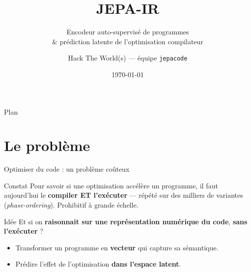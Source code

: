 \documentclass[aspectratio=169,11pt]{beamer}
\title{JEPA-IR}
\subtitle{Encodeur auto-supervisé de programmes \\ \& prédiction latente de l'optimisation compilateur}
\author{Hack The World(s) — équipe \texttt{jepacode}}
\date{\today}
\newcommand{\hl}[1]{\textcolor{jblue}{\textbf{#1}}}
\newcommand{\bad}[1]{\textcolor{jred}{\textbf{#1}}}
\begin{document}
\maketitle

\begin{frame}{Plan}
  \tableofcontents
\end{frame}

\section{Le problème}
\begin{frame}{Optimiser du code : un problème coûteux}
  \begin{block}{Constat}
    Pour savoir si une optimisation accélère un programme, il faut aujourd'hui
    le \bad{compiler ET l'exécuter} — répété sur des milliers de variantes
    (\emph{phase-ordering}). Prohibitif à grande échelle.
  \end{block}
  \pause
  \begin{alertblock}{Idée}
    Et si on \hl{raisonnait sur une représentation numérique du code},
    \hl{sans l'exécuter} ?
  \end{alertblock}
  \pause
  \begin{itemize}
    \item Transformer un programme en \textbf{vecteur} qui capture sa sémantique.
    \item Prédire l'effet de l'optimisation \textbf{dans l'espace latent}.
  \end{itemize}
\end{frame}

\end{document}
